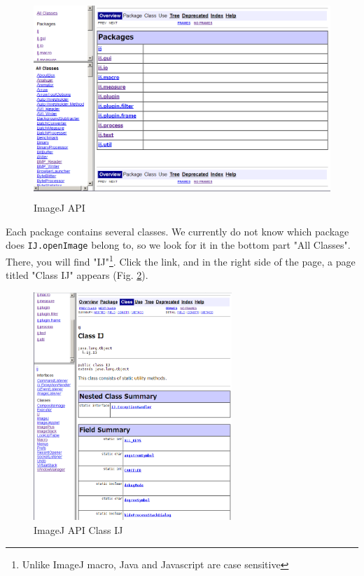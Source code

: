 \documentclass[11pt,a4paper,oneside]{report}
\newcommand{\ilcom}[1]{\texttt{\small#1}}
\begin{document}
\begin{figure}[htbp]
\begin{center}
\includegraphics[height=75mm]{fig2/IJAPItop.png}
\caption{ImageJ API}
\label{fig:IJAPItoppage}
\end{center}
\end{figure}


Each package contains several classes. We currently do not know which package does \ilcom{IJ.openImage} belong to, so we look for it in the bottom part "All Classes". There, you will find "IJ"\footnote{ Unlike ImageJ macro, Java and Javascript are case sensitive}. Click the link, and in the right side of the page, a page titled "Class IJ" appears (Fig. \ref{fig:IJAPClassIJ}). 

\begin{figure}[htbp]
\begin{center}
\includegraphics[width=75mm]{fig2/IJAPI_IJ.png}
\caption{ImageJ API Class IJ}
\label{fig:IJAPClassIJ}
\end{center}
\end{figure}
\end{document}
